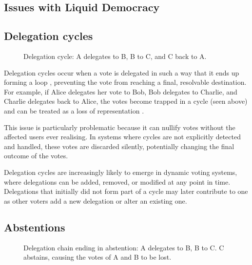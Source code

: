 \subsection{Issues with Liquid Democracy}

\subsection*{Delegation cycles}
\begin{figure}[h]
    \centering
    \caption{Delegation cycle: A delegates to B, B to C, and C back to A.}
    \label{fig:triangle-cycle}
\end{figure}


Delegation cycles occur when a vote is delegated in such a way that it ends up forming a loop \citep{brill_liquid_2022}, preventing the vote from reaching a final, resolvable destination. For example, if Alice delegates her vote to Bob, Bob delegates to Charlie, and Charlie delegates back to Alice, the votes become trapped in a cycle (seen above) and can be treated as a loss of representation \citep{christoff2017liquiddemocracyanalysisbinary}.

This issue is particularly problematic because it can nullify votes without the affected users ever realising. In systems where cycles are not explicitly detected and handled, these votes are discarded silently, potentially changing the final outcome of the votes.

Delegation cycles are increasingly likely to emerge in dynamic voting systems, where delegations can be added, removed, or modified at any point in time. Delegations that initially did not form part of a cycle may later contribute to one as other voters add a new delegation or alter an existing one.
\subsection*{Abstentions}
\begin{figure}[h]
    \centering
    \caption{Delegation chain ending in abstention: A delegates to B, B to C. C abstains, causing the votes of A and B to be lost.}
    \label{fig:delegation-abstention}
\end{figure}

